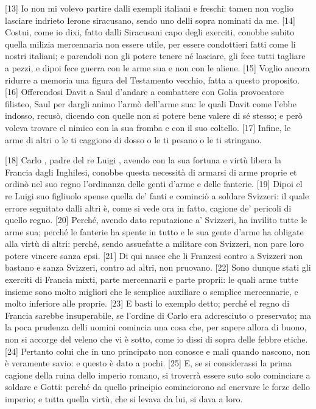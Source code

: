 {[}13{]} Io non mi volevo partire dalli exempli italiani e freschi:
tamen non voglio lasciare indrieto Ierone siracusano, sendo uno delli
sopra nominati da me. {[}14{]} Costui, come io dixi, fatto dalli
Siracusani capo degli exerciti, conobbe subito quella milizia
mercennaria non essere utile, per essere condottieri fatti come li
nostri italiani; e parendoli non gli potere tenere né lasciare, gli fece
tutti tagliare a pezzi, e dipoi fece guerra con le arme sua e non con le
aliene. {[}15{]} Voglio ancora ridurre a memoria una figura del
Testamento vecchio, fatta a questo proposito. {[}16{]} Offerendosi Davit
a Saul d'andare a combattere con Golia provocatore filisteo, Saul per
dargli animo l'armò dell'arme sua: le quali Davit come l'ebbe indosso,
recusò, dicendo con quelle non si potere bene valere di sé stesso; e
però voleva trovare el nimico con la sua fromba e con il suo coltello.
{[}17{]} Infine, le arme di altri o le ti caggiono di dosso o le ti
pesano o le ti stringano.

{[}18{]} Carlo , padre del re Luigi , avendo con la sua fortuna e
virtù libera la Francia dagli Inghilesi, conobbe questa necessità di
armarsi di arme proprie et ordinò nel suo regno l'ordinanza delle genti
d'arme e delle fanterie. {[}19{]} Dipoi el re Luigi suo figliuolo spense
quella de' fanti e cominciò a soldare Svizzeri: il quale errore
seguitato dalli altri è, come si vede ora in fatto, cagione de' pericoli
di quello regno. {[}20{]} Perché, avendo dato reputazione a' Svizzeri,
ha invilito tutte le arme sua; perché le fanterie ha spente in tutto e
le sua gente d'arme ha obligate alla virtù di altri: perché, sendo
assuefatte a militare con Svizzeri, non pare loro potere vincere sanza
epsi. {[}21{]} Di qui nasce che li Franzesi contro a Svizzeri non
bastano e sanza Svizzeri, contro ad altri, non pruovano. {[}22{]} Sono
dunque stati gli exerciti di Francia mixti, parte mercennarii e parte
proprii: le quali arme tutte insieme sono molto migliori che le semplice
auxiliare o semplice mercennarie, e molto inferiore alle proprie.
{[}23{]} E basti lo exemplo detto; perché el regno di Francia sarebbe
insuperabile, se l'ordine di Carlo era adcresciuto o preservato; ma la
poca prudenza delli uomini comincia una cosa che, per sapere allora di
buono, non si accorge del veleno che vi è sotto, come io dissi di sopra
delle febbre etiche. {[}24{]} Pertanto colui che in uno principato non
conosce e mali quando nascono, non è veramente savio: e questo è dato a
pochi. {[}25{]} E, se si considerassi la prima cagione della ruina dello
imperio romano, si troverrà essere suto solo cominciare a soldare e
Gotti: perché da quello principio cominciorono ad enervare le forze
dello imperio; e tutta quella virtù, che si levava da lui, si dava a
loro.

